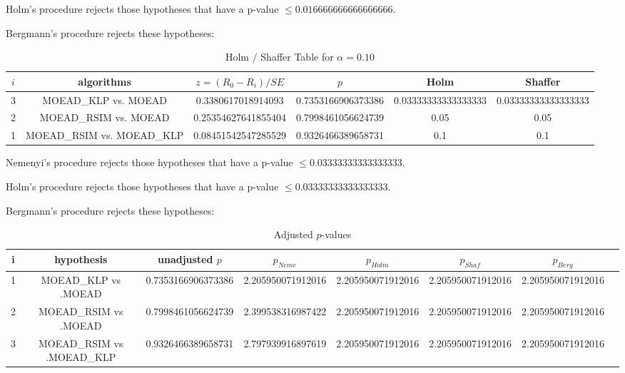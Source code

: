 \documentclass[a4paper,10pt]{article}
\begin{document}
\begin{landscape}
Holm's procedure rejects those hypotheses that have a p-value $\le0.016666666666666666$.


Bergmann's procedure rejects these hypotheses:


\begin{itemize}


\end{itemize}


\begin{table}[!htp]
\centering\tiny
\caption{Holm / Shaffer Table for $\alpha=0.10$}
\begin{tabular}{cccccc}
$i$&algorithms&$z=(R_0 - R_i)/SE$&$p$&Holm&Shaffer\\
\hline
3&MOEAD_KLP vs. MOEAD&0.3380617018914093&0.7353166906373386&0.03333333333333333&0.03333333333333333\\
2&MOEAD_RSIM vs. MOEAD&0.25354627641855404&0.7998461056624739&0.05&0.05\\
1&MOEAD_RSIM vs. MOEAD_KLP&0.08451542547285529&0.9326466389658731&0.1&0.1\\
\hline
\end{tabular}
\end{table}
Nemenyi's procedure rejects those hypotheses that have a p-value $\le0.03333333333333333$.


Holm's procedure rejects those hypotheses that have a p-value $\le0.03333333333333333$.


Bergmann's procedure rejects these hypotheses:


\begin{itemize}


\end{itemize}


\begin{table}[!htp]
\centering\tiny
\caption{Adjusted $p$-values}
\begin{tabular}{cccccccc}
i&hypothesis&unadjusted $p$&$p_{Neme}$&$p_{Holm}$&$p_{Shaf}$&$p_{Berg}$\\
\hline
1&MOEAD_KLP vs .MOEAD&0.7353166906373386&2.205950071912016&2.205950071912016&2.205950071912016&2.205950071912016\\
2&MOEAD_RSIM vs .MOEAD&0.7998461056624739&2.399538316987422&2.205950071912016&2.205950071912016&2.205950071912016\\
3&MOEAD_RSIM vs .MOEAD_KLP&0.9326466389658731&2.797939916897619&2.205950071912016&2.205950071912016&2.205950071912016\\
\hline
\end{tabular}
\end{table}

\end{landscape}
\end{document}
